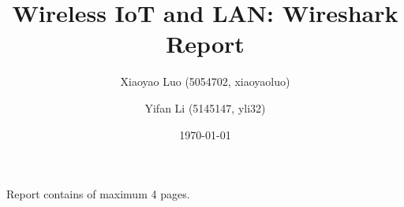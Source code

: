 \documentclass[twocolumn]{article}
\title{\large{\textbf{Wireless IoT and LAN: Wireshark Report}}}
\author{
    \small Xiaoyao Luo (5054702, xiaoyaoluo) \and
    \small Yifan Li (5145147, yli32)
}
\date{\today}
\begin{document}
\maketitle

\begin{center}
Report contains \pageref{LastPage} of maximum 4 pages.
\end{center}


\newline

\newpage




\newline


\newline
\end{document}
